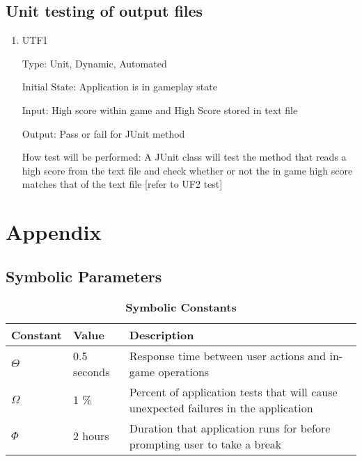 \documentclass[12pt, titlepage]{article}
\begin{document}
\subsection{Unit testing of output files}	

\begin{enumerate}

\item{UTF1\\}

Type: Unit, Dynamic, Automated
					
Initial State: Application is in gameplay state
					
Input: High score within game and High Score stored in text file
					
Output: Pass or fail for JUnit method
					
How test will be performed: A JUnit class will test the method that reads a high score from the text file and check whether or not the in game high score matches that of the text file [refer to UF2 test]

\end{enumerate}	

%

%

\newpage

\section{Appendix}

\subsection{Symbolic Parameters}


\begin{table}[H]
\caption{\bf Symbolic Constants} \label{tab:constants}
\begin{tabularx}{\textwidth}{p{3cm}p{2cm}X}
\toprule {\bf Constant} & {\bf Value} & {\bf Description}\\
\midrule
$\Theta$ & 0.5 seconds & Response time between user actions and in-game operations\\
$\Omega$ & 1 \% & Percent of application tests that will cause unexpected failures in the application\\
$\Phi$ & 2 hours & Duration that application runs for before prompting user to take a break\\
\bottomrule
\end{tabularx}
\end{table}
\end{document}
